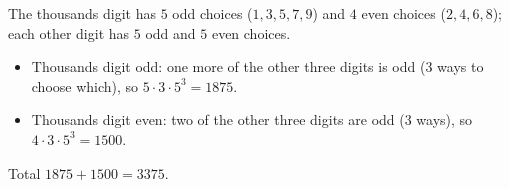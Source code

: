 The thousands digit has $5$ odd choices ($1,3,5,7,9$) and $4$ even choices ($2,4,6,8$); each other digit has $5$ odd and $5$ even choices.
\begin{itemize}
\item Thousands digit odd: one more of the other three digits is odd ($3$ ways to choose which), so $5\cdot3\cdot5^3=1875$.
\item Thousands digit even: two of the other three digits are odd ($3$ ways), so $4\cdot3\cdot5^3=1500$.
\end{itemize}
Total $1875+1500=\boxed{3375}$.
